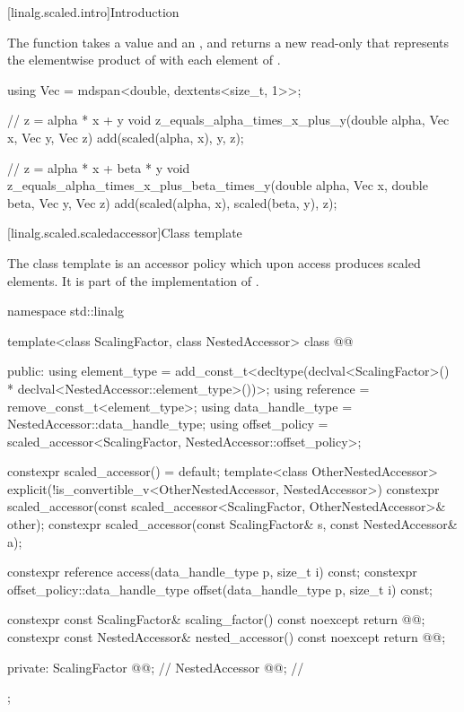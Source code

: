 [linalg.scaled.intro]{Introduction}

\pnum
The  function
takes a value  and an  , and
returns a new read-only 
that represents
the elementwise product of  with each element of .
\begin{example}
\begin{codeblock}
using Vec = mdspan<double, dextents<size_t, 1>>;

// z = alpha * x + y
void z_equals_alpha_times_x_plus_y(double alpha, Vec x, Vec y, Vec z) {
  add(scaled(alpha, x), y, z);
}

// z = alpha * x + beta * y
void z_equals_alpha_times_x_plus_beta_times_y(double alpha, Vec x, double beta, Vec y, Vec z) {
  add(scaled(alpha, x), scaled(beta, y), z);
}
\end{codeblock}
\end{example}

[linalg.scaled.scaledaccessor]{Class template }

\pnum
The class template  is an  accessor policy
which upon access produces scaled elements.
It is part of the implementation of .
\begin{codeblock}
namespace std::linalg {
  template<class ScalingFactor, class NestedAccessor>
  class @@ {
  public:
    using element_type =
      add_const_t<decltype(declval<ScalingFactor>() * declval<NestedAccessor::element_type>())>;
    using reference = remove_const_t<element_type>;
    using data_handle_type = NestedAccessor::data_handle_type;
    using offset_policy = scaled_accessor<ScalingFactor, NestedAccessor::offset_policy>;

    constexpr scaled_accessor() = default;
    template<class OtherNestedAccessor>
      explicit(!is_convertible_v<OtherNestedAccessor, NestedAccessor>)
        constexpr scaled_accessor(const scaled_accessor<ScalingFactor,
                                                        OtherNestedAccessor>& other);
    constexpr scaled_accessor(const ScalingFactor& s, const NestedAccessor& a);

    constexpr reference access(data_handle_type p, size_t i) const;
    constexpr offset_policy::data_handle_type offset(data_handle_type p, size_t i) const;

    constexpr const ScalingFactor& scaling_factor() const noexcept { return @@; }
    constexpr const NestedAccessor& nested_accessor() const noexcept { return @@; }

  private:
    ScalingFactor @@{};                              // \expos
    NestedAccessor @@{};                            // \expos
  };
}
\end{codeblock}

